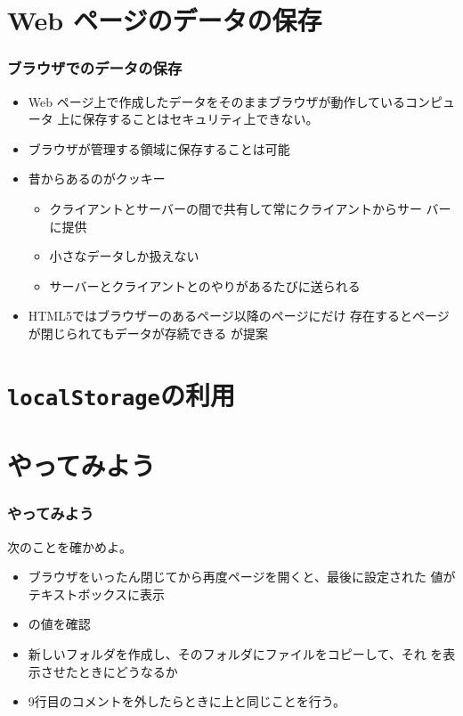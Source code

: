 

\frame{\maketitle}
\section{Web ページのデータの保存}
\begin{frame}[containsverbatim]
\frametitle{ブラウザでのデータの保存}
\begin{itemize}
 \item Web ページ上で作成したデータをそのままブラウザが動作しているコンピュータ
上に保存することはセキュリティ上できない。
 \item ブラウザが管理する領域に保存することは可能
 \item 昔からあるのがクッキー
			 \begin{itemize}
				\item クライアントとサーバーの間で共有して常にクライアントからサー
							バーに提供
				\item 小さなデータしか扱えない
				\item サーバーとクライアントとのやりがあるたびに送られる
			 \end{itemize}
 \item HTML5ではブラウザーのあるページ以降のページにだけ
存在するとページが閉じられてもデータが存続できる
が提案
\end{itemize}
\end{frame}
\section{\texttt{localStorage}の利用}
\section{やってみよう}
\begin{frame}[containsverbatim]
\frametitle{やってみよう}
次のことを確かめよ。
\begin{itemize}
 \item ブラウザをいったん閉じてから再度ページを開くと、最後に設定された
       値がテキストボックスに表示
 \item {}の値を確認
 \item 新しいフォルダを作成し、そのフォルダにファイルをコピーして、それ
       を表示させたときにどうなるか
 \item 9行目のコメントを外したらときに上と同じことを行う。
\end{itemize} 
\end{frame}
 
\begin{frame}[containsverbatim]
\frametitle{}
\end{frame}
